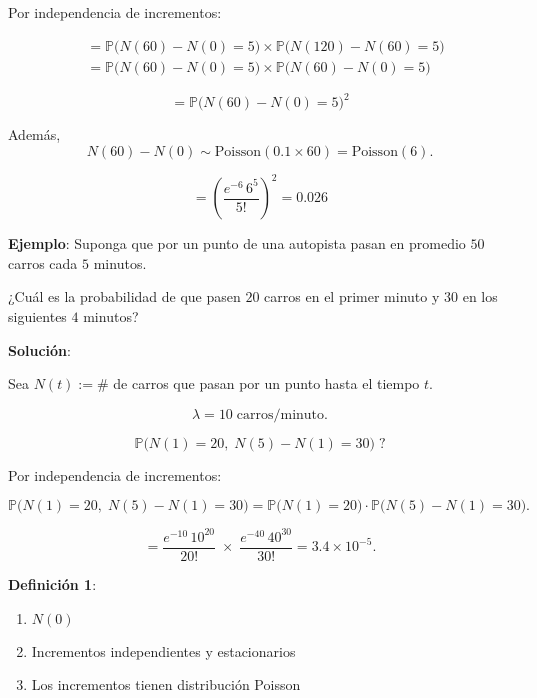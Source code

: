 \documentclass[12pt]{article}
\begin{document}
Por independencia de incrementos:

\begin{align*}
&= \mathbb{P}\big(N(60) - N(0) = 5\big) \times \mathbb{P}\big(N(120) - N(60) = 5\big) \\
&= \mathbb{P}\big(N(60) - N(0) = 5\big) \times \mathbb{P}\big(N(60) - N(0) = 5\big)
\end{align*}

\begin{equation*}
= \mathbb{P}\big(N(60) - N(0) = 5\big)^2
\end{equation*}

Además,
\begin{equation*}
N(60) - N(0) \sim \text{Poisson}(0.1 \times 60) = \text{Poisson}(6).
\end{equation*}

\begin{equation*}
= \left( \frac{e^{-6} \, 6^5}{5!} \right)^2 = 0.026
\end{equation*}

\textbf{Ejemplo}: Suponga que por un punto de una autopista pasan en promedio $50$ carros cada $5$ minutos.  

¿Cuál es la probabilidad de que pasen $20$ carros en el primer minuto y $30$ en los siguientes $4$ minutos?

\textbf{Solución}:

Sea $N(t) := \#$ de carros que pasan por un punto hasta el tiempo $t$.

\begin{equation*}
\lambda = 10 \; \text{carros/minuto}.
\end{equation*}

\begin{equation*}
\mathbb{P}\big(N(1)=20,\; N(5)-N(1)=30\big)\; ?
\end{equation*}

Por independencia de incrementos:

\begin{equation*}
\mathbb{P}\big(N(1)=20,\; N(5)-N(1)=30\big)
= \mathbb{P}\big(N(1)=20\big)\cdot \mathbb{P}\big(N(5)-N(1)=30\big).
\end{equation*}

\begin{equation*}
= \frac{e^{-10}\,10^{20}}{20!} \; \times \; \frac{e^{-40}\,40^{30}}{30!}
= 3.4 \times 10^{-5}.
\end{equation*}

\textbf{Definición 1}:

\begin{enumerate}
    \item $N(0)$
    \item Incrementos independientes y estacionarios
    \item Los incrementos tienen distribución Poisson
\end{enumerate}
\end{document}
